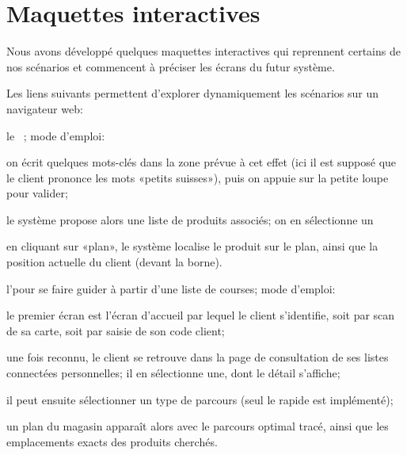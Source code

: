 \chapter{Maquettes interactives}

Nous avons développé quelques maquettes interactives qui reprennent certains de nos scénarios et commencent à préciser les écrans du futur système.


Les liens suivants permettent d'explorer dynamiquement les scénarios sur un navigateur web:
\startitemize
\item le \cu\ \from[BE]; mode d'emploi:
    \startitemize[n]
    \item on écrit quelques mots-clés dans la zone prévue à cet effet (ici il est supposé que le client prononce les mots «petits suisses»), puis on appuie sur la petite loupe pour valider;
    \item le système propose alors une liste de produits associés; on en sélectionne un
    \item en cliquant sur «plan», le système localise le produit sur le plan, ainsi que la position actuelle du client (devant la borne).
    \stopitemize
\item l'\from[GUIDE] pour se faire guider à partir d'une liste de courses; mode d'emploi:
    \startitemize[n]
\item le premier écran est l'écran d'accueil par lequel le client s'identifie, soit par scan de sa carte, soit par saisie de son code client;
\item une fois reconnu, le client se retrouve dans la page de consultation de ses listes connectées personnelles; il en sélectionne une, dont le détail s'affiche;
\item il peut ensuite sélectionner un type de parcours (seul le rapide est implémenté);
\item un plan du magasin apparaît alors avec le parcours optimal tracé, ainsi que les emplacements exacts des produits cherchés.
    \stopitemize
\stopitemize
